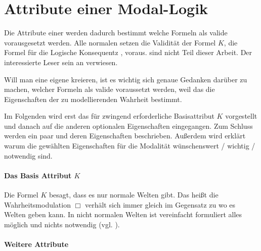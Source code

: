 

\section{Attribute einer Modal-Logik} %
\label{sub:attribute_einer_modal_logik}
Die Attribute einer \ML werden dadurch bestimmt welche Formeln als valide vorausgesetzt werden.
Alle normalen \ML setzen die Validität der Formel $K$, die Formel für die Logische Konsequentz , voraus.
\NNMLn sind nicht Teil dieser Arbeit. 
Der interessierte Leser sein an  verwiesen.

Will man eine eigene \ML kreieren, ist es wichtig sich genaue Gedanken darüber zu machen, welcher Formeln als valide voraussetzt werden, weil das die Eigenschaften der zu modellierenden Wahrheit bestimmt.

Im Folgenden wird erst das für \NML zwingend erforderliche Basisattribut $K$ vorgestellt und danach auf die anderen optionalen Eigenschaften eingegangen.
Zum Schluss werden ein paar \MLn und deren Eigenschaften beschrieben.
Außerdem wird erklärt warum die gewählten Eigenschaften für die Modalität wünschenswert / wichtig / notwendig sind.

\paragraph{Das Basis Attribut $K$} %
\label{par:das_basis_atribute_k_} Die Formel $K$ \KFormel besagt, dass es nur normale Welten gibt. Das heißt die Wahrheitsmodulation $\Box$ verhält sich immer gleich im Gegensatz zu \NNML wo es  Welten geben kann.
In nicht normalen Welten ist vereinfacht formuliert alles möglich und nichts notwendig (vgl. \cite[S.75]{Priest:2008}).


\paragraph{Weitere Attribute} %
\label{par:weitere_attribute} 

